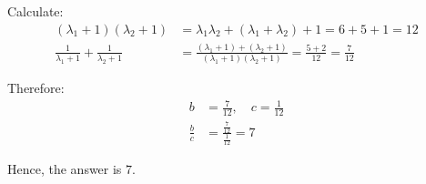 \documentclass[journal]{IEEEtran}
\begin{document}
Calculate:
\begin{align}
(\lambda_1+1)(\lambda_2+1) &= \lambda_1\lambda_2 + (\lambda_1+\lambda_2) + 1 = 6 + 5 + 1 = 12 \\
\frac{1}{\lambda_1+1} + \frac{1}{\lambda_2+1} &= \frac{(\lambda_1+1) + (\lambda_2+1)}{(\lambda_1+1)(\lambda_2+1)} = \frac{5+2}{12} = \frac{7}{12}
\end{align}

Therefore:
\begin{align}
b &= \frac{7}{12},\quad c = \frac{1}{12} \\
\frac{b}{c} &= \frac{\frac{7}{12}}{\frac{1}{12}} = 7
\end{align}

Hence, the answer is $7$.
\end{document}
